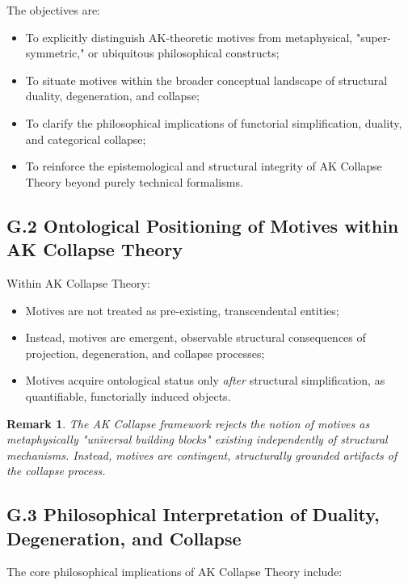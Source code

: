 \documentclass[11pt]{article}
\newtheorem{remark}[theorem]{Remark}
\begin{document}
The objectives are:

\begin{itemize}
    \item To explicitly distinguish AK-theoretic motives from metaphysical, "super-symmetric," or ubiquitous philosophical constructs;
    \item To situate motives within the broader conceptual landscape of structural duality, degeneration, and collapse;
    \item To clarify the philosophical implications of functorial simplification, duality, and categorical collapse;
    \item To reinforce the epistemological and structural integrity of AK Collapse Theory beyond purely technical formalisms.
\end{itemize}

\subsection*{G.2 Ontological Positioning of Motives within AK Collapse Theory}

Within AK Collapse Theory:

\begin{itemize}
    \item Motives are not treated as pre-existing, transcendental entities;
    \item Instead, motives are emergent, observable structural consequences of projection, degeneration, and collapse processes;
    \item Motives acquire ontological status only \emph{after} structural simplification, as quantifiable, functorially induced objects.
\end{itemize}

\begin{remark}
The AK Collapse framework rejects the notion of motives as metaphysically "universal building blocks" existing independently of structural mechanisms. Instead, motives are contingent, structurally grounded artifacts of the collapse process.
\end{remark}

\subsection*{G.3 Philosophical Interpretation of Duality, Degeneration, and Collapse}

The core philosophical implications of AK Collapse Theory include:
\end{document}
